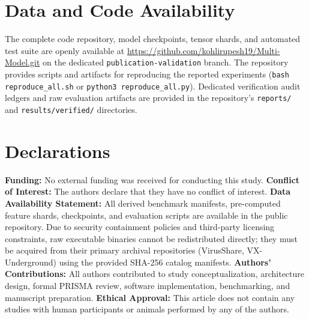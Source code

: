 \documentclass[pdflatex,sn-mathphys-num]{sn-jnl}
\begin{document}
\section{Data and Code Availability}\label{sec:availability}
The complete code repository, model checkpoints, tensor shards, and automated test suite are openly available at \url{https://github.com/kohlirupesh19/Multi-Model.git} on the dedicated \texttt{publication-validation} branch. The repository provides scripts and artifacts for reproducing the reported experiments (\texttt{bash reproduce\_all.sh} or \texttt{python3 reproduce\_all.py}). Dedicated verification audit ledgers and raw evaluation artifacts are provided in the repository's \texttt{reports/} and \texttt{results/verified/} directories.

\section{Declarations}\label{sec:declarations}
\textbf{Funding:} No external funding was received for conducting this study.  
\textbf{Conflict of Interest:} The authors declare that they have no conflict of interest.  
\textbf{Data Availability Statement:} All derived benchmark manifests, pre-computed feature shards, checkpoints, and evaluation scripts are available in the public repository. Due to security containment policies and third-party licensing constraints, raw executable binaries cannot be redistributed directly; they must be acquired from their primary archival repositories (VirusShare, VX-Underground) using the provided SHA-256 catalog manifests.  
\textbf{Authors' Contributions:} All authors contributed to study conceptualization, architecture design, formal PRISMA review, software implementation, benchmarking, and manuscript preparation.  
\textbf{Ethical Approval:} This article does not contain any studies with human participants or animals performed by any of the authors.


\end{document}
